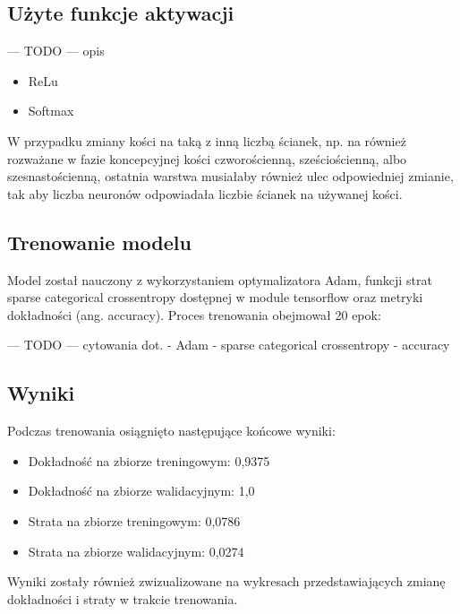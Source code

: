 \subsection{Użyte funkcje aktywacji}
--- TODO --- opis
\begin{itemize}
    \item ReLu
    \item Softmax
\end{itemize}

W przypadku zmiany kości na taką z inną liczbą ścianek, np.
na również rozważane w fazie koncepcyjnej kości czworościenną, sześciościenną, albo szesnastościenną,
ostatnia warstwa musiałaby również ulec odpowiedniej zmianie,
tak aby liczba neuronów odpowiadała liczbie ścianek na używanej kości.

\subsection{Trenowanie modelu}\label{subsec:trenowanie-modelu}

Model został nauczony z wykorzystaniem optymalizatora Adam,
funkcji strat sparse categorical crossentropy dostępnej w module tensorflow oraz metryki dokładności (ang. accuracy).
Proces trenowania obejmował 20 epok:

--- TODO ---
cytowania dot.
- Adam
- sparse categorical crossentropy
- accuracy

\subsection{Wyniki}\label{subsec:wyniki}

Podczas trenowania osiągnięto następujące końcowe wyniki:

\begin{itemize}
    \item Dokładność na zbiorze treningowym: 0,9375
    \item Dokładność na zbiorze walidacyjnym: 1,0
    \item Strata na zbiorze treningowym: 0,0786
    \item Strata na zbiorze walidacyjnym: 0,0274
\end{itemize}

Wyniki zostały również zwizualizowane na wykresach przedstawiających zmianę dokładności i straty w trakcie trenowania.

